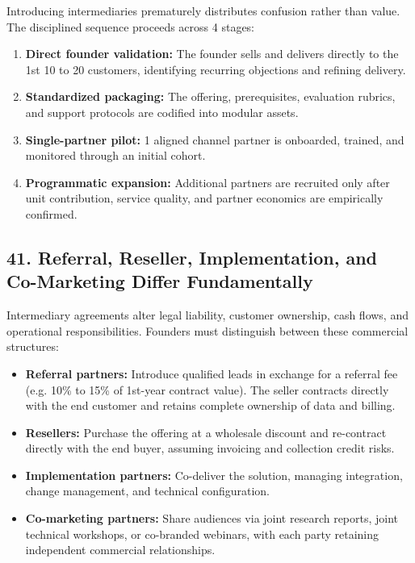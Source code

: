 Introducing intermediaries prematurely distributes confusion rather than value. The disciplined sequence proceeds across 4 stages:
\begin{enumerate}[leftmargin=*,itemsep=1pt]
  \item \textbf{Direct founder validation:} The founder sells and delivers directly to the 1st 10 to 20 customers, identifying recurring objections and refining delivery.
  \item \textbf{Standardized packaging:} The offering, prerequisites, evaluation rubrics, and support protocols are codified into modular assets.
  \item \textbf{Single-partner pilot:} 1 aligned channel partner is onboarded, trained, and monitored through an initial cohort.
  \item \textbf{Programmatic expansion:} Additional partners are recruited only after unit contribution, service quality, and partner economics are empirically confirmed.
\end{enumerate}

\subsection*{41. Referral, Reseller, Implementation, and Co-Marketing Differ Fundamentally}

Intermediary agreements alter legal liability, customer ownership, cash flows, and operational responsibilities. Founders must distinguish between these commercial structures:
\begin{itemize}[leftmargin=*,itemsep=1pt]
  \item \textbf{Referral partners:} Introduce qualified leads in exchange for a referral fee (e.g. 10\% to 15\% of 1st-year contract value). The seller contracts directly with the end customer and retains complete ownership of data and billing.
  \item \textbf{Resellers:} Purchase the offering at a wholesale discount and re-contract directly with the end buyer, assuming invoicing and collection credit risks.
  \item \textbf{Implementation partners:} Co-deliver the solution, managing integration, change management, and technical configuration.
  \item \textbf{Co-marketing partners:} Share audiences via joint research reports, joint technical workshops, or co-branded webinars, with each party retaining independent commercial relationships.
\end{itemize}


